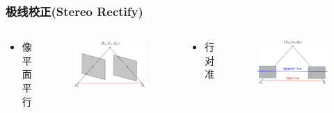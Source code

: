 \documentclass[aspectratio=43]{beamer}
\begin{document}
		\begin{frame}
		\frametitle{极线校正(Stereo Rectify)}
		\begin{columns}
		\column{5cm}
		\begin{center}
		\begin{itemize}
			\item 像平面平行
		\end{itemize}
		\end{center}
		\begin{figure}
			\includegraphics[scale=0.45]{极线校正-像平面平行}
		\end{figure}	
		\column{5cm}
		\begin{center}
		\begin{itemize}
			\item 行对准
		\end{itemize}
		\end{center}
		\begin{figure}
			\includegraphics[scale=0.47]{极线校正-行对准}
		\end{figure}
		\end{columns}
		\end{frame}
	
\end{document}
